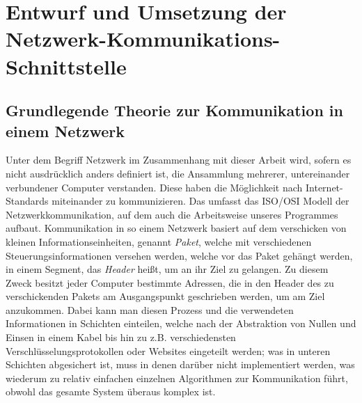 
%
\section{Entwurf und Umsetzung der Netzwerk-Kommunikations-Schnittstelle}
\subsection{Grundlegende Theorie zur Kommunikation in einem Netzwerk}
Unter dem Begriff Netzwerk im Zusammenhang mit dieser Arbeit wird, sofern es nicht ausdrücklich anders definiert ist, die Ansammlung mehrerer, untereinander verbundener Computer verstanden.
Diese haben die Möglichkeit nach Internet-Standards miteinander zu kommunizieren.
Das umfasst das ISO/OSI Modell der Netzwerkkommunikation, auf dem auch die Arbeitsweise unseres Programmes aufbaut.
Kommunikation in so einem Netzwerk basiert auf dem verschicken von kleinen Informationseinheiten, genannt \textit{Paket}, welche mit verschiedenen Steuerungsinformationen versehen werden, welche vor das Paket gehängt werden, in einem Segment, das \textit{Header} heißt, um an ihr Ziel zu gelangen.
Zu diesem Zweck besitzt jeder Computer bestimmte Adressen, die in den Header des zu verschickenden Pakets am Ausgangspunkt geschrieben werden, um am Ziel anzukommen.
Dabei kann man diesen Prozess und die verwendeten Informationen in Schichten einteilen, welche nach der Abstraktion von Nullen und Einsen in einem Kabel bis hin zu z.B. verschiedensten Verschlüsselungsprotokollen oder Websites eingeteilt werden; was in unteren Schichten abgesichert ist, muss in denen darüber nicht implementiert werden, was wiederum zu relativ einfachen einzelnen Algorithmen zur Kommunikation führt, obwohl das gesamte System überaus komplex ist.

